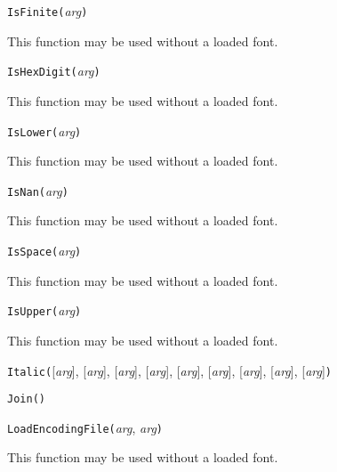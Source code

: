 \texttt{IsFinite(}\textit{arg}\texttt{)}

This function may be used without a loaded font.



\texttt{IsHexDigit(}\textit{arg}\texttt{)}

This function may be used without a loaded font.



\texttt{IsLower(}\textit{arg}\texttt{)}

This function may be used without a loaded font.



\texttt{IsNan(}\textit{arg}\texttt{)}

This function may be used without a loaded font.



\texttt{IsSpace(}\textit{arg}\texttt{)}

This function may be used without a loaded font.



\texttt{IsUpper(}\textit{arg}\texttt{)}

This function may be used without a loaded font.



\texttt{Italic(}[\textit{arg}], [\textit{arg}], [\textit{arg}], [\textit{arg}], [\textit{arg}], [\textit{arg}], [\textit{arg}], [\textit{arg}], [\textit{arg}]\texttt{)}



\texttt{Join(}\texttt{)}



\texttt{LoadEncodingFile(}\textit{arg}, \textit{arg}\texttt{)}

This function may be used without a loaded font.

